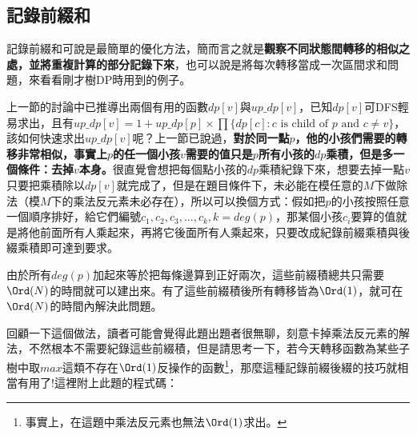 \subsection{記錄前綴和}
記錄前綴和可說是最簡單的優化方法，簡而言之就是\textbf{觀察不同狀態間轉移的相似之處，並將重複計算的部分記錄下來}，也可以說是將每次轉移當成一次區間求和問題，來看看剛才樹DP時用到的例子。

上一節的討論中已推導出兩個有用的函數$dp[v]$與$up\_dp[v]$，已知$dp[v]$可DFS輕易求出，且有$up\_dp[v] = 1 + up\_dp[p] \times \prod{\{dp[c] : c\mbox{ is child of }p \mbox{ and } c \neq v \}}$，該如何快速求出$up\_dp[v]$呢？上一節已說過，\textbf{對於同一點$p$，他的小孩們需要的轉移非常相似，事實上$p$的任一個小孩$v$需要的值只是$p$所有小孩的$dp$乘積，但是多一個條件：去掉$v$本身。}很直覺會想把每個點小孩的$dp$乘積紀錄下來，想要去掉一點$v$只要把乘積除以$dp[v]$就完成了，但是在題目條件下，未必能在模任意的$M$下做除法（模$M$下的乘法反元素未必存在），所以可以換個方式：假如把$p$的小孩按照任意一個順序排好，給它們編號$c_1, c_2, c_3, ..., c_k, k = deg(p)$，那某個小孩$c_i$要算的值就是將他前面所有人乘起來，再將它後面所有人乘起來，只要改成紀錄前綴乘積與後綴乘積即可達到要求。

由於所有$deg(p)$加起來等於把每條邊算到正好兩次，這些前綴積總共只需要$\Ord(N)$的時間就可以建出來。有了這些前綴積後所有轉移皆為$\Ord(1)$，就可在$\Ord(N)$的時間內解決此問題。

回顧一下這個做法，讀者可能會覺得此題出題者很無聊，刻意卡掉乘法反元素的解法，不然根本不需要紀錄這些前綴積，但是請思考一下，若今天轉移函數為某些子樹中取$max$這類不存在$\Ord(1)$反操作的函數\footnote{事實上，在這題中乘法反元素也無法$\Ord(1)$求出。}，那麼這種記錄前綴後綴的技巧就相當有用了!這裡附上此題的程式碼：

